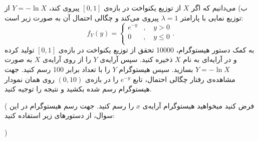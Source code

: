 \documentclass[10pt,letterpaper]{report}
\newcounter{questionanswernumber}
\newcommand{\QA}{
\textbf{پاسخ سوال \thequestionanswernumber)}
\stepcounter{questionanswernumber}
}
\begin{document}
ب) می‌دانیم که اگر 
$
X
$
از توزیع یکنواخت در بازه‌ی 
$
[0,1]
$
پیروی کند، 
$
Y=-\ln X
$
از توزیع نمایی با پارامتر 
$
\lambda=1
$
پیروی می‌کند و چگالی احتمال آن به صورت زیر است:
$$
f_Y(y)=\begin{cases}
e^{-y}&,\quad y>0\\
0&,\quad y\le0\\
\end{cases}.
$$
به کمک دستور هیستوگرام، 10000 تحقق از توزیع یکنواخت در بازه‌ی 
$
[0,1]
$
تولید کرده و در آرایه‌ای به نام
$
X
$
ذخیره کنید. سپس آرایه‌ی
$
Y
$
را از روی آرایه‌ی
$
X
$
به صورت
$
Y=-\ln X
$
بسازید. سپس هیستوگرام $Y$ را با تعداد  برابر 100 رسم کنید. جهت مشاهده‌ی رفتار چگالی احتمال، تابع
$
e^{-y}
$
را در بازه‌ی 
$
(0,10)
$
روی همان نمودار هیستوگرام رسم شده بکشید و نتیجه را توجیه کنید.

(
فرض کنید میخواهید هیستوگرام آرایه‌ی $x$ را رسم کنید. جهت رسم هیستوگرام در این سوال، از دستورهای زیر استفاده کنید:


)

%
\end{document}
